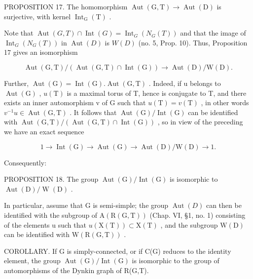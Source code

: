 PROPOSITION 17. The homomorphism \(\operatorname{Aut}(\mathrm{G},\mathrm{T})\to \operatorname{Aut}(\mathrm{D})\) is surjective, with kernel \(\operatorname{Int}_{\mathrm{G}}(\mathrm{T})\) .

Note that \(\operatorname{Aut}(G,T) \cap \operatorname{Int}(G) = \operatorname{Int}_{G}(N_{G}(T))\) and that the image of \(\operatorname{Int}_{G}(N_{G}(T))\) in \(\operatorname{Aut}(D)\) is \(W(D)\) (no. 5, Prop. 10). Thus, Proposition 17 gives an isomorphism

\[
\operatorname{Aut} (\mathrm{G}, \mathrm{T}) / (\operatorname{Aut} (\mathrm{G}, \mathrm{T}) \cap \operatorname{Int} (\mathrm{G})) \rightarrow \operatorname{Aut} (\mathrm{D}) / \mathrm{W} (\mathrm{D}).
\]

Further, \(\operatorname{Aut}(\mathrm{G}) = \operatorname{Int}(\mathrm{G}).\operatorname{Aut}(\mathrm{G}, \mathrm{T})\) . Indeed, if u belongs to \(\operatorname{Aut}(\mathrm{G})\) , \(u(\mathrm{T})\) is a maximal torus of T, hence is conjugate to T, and there exists an inner automorphism v of G such that \(u(\mathrm{T}) = v(\mathrm{T})\) , in other words \(v^{-1}u \in \operatorname{Aut}(\mathrm{G}, \mathrm{T})\) . It follows that \(\operatorname{Aut}(\mathrm{G})/\operatorname{Int}(\mathrm{G})\) can be identified with \(\operatorname{Aut}(\mathrm{G}, \mathrm{T})/(\operatorname{Aut}(\mathrm{G}, \mathrm{T}) \cap \operatorname{Int}(\mathrm{G}))\) , so in view of the preceding we have an exact sequence

\[
1 \to \operatorname{Int} (\mathrm{G}) \to \operatorname{Aut} (\mathrm{G}) \to \operatorname{Aut} (\mathrm{D}) / \mathrm{W} (\mathrm{D}) \to 1.\tag{16}
\]

Consequently:

PROPOSITION 18. The group \(\operatorname{Aut}(\mathrm{G}) / \operatorname{Int}(\mathrm{G})\) is isomorphic to \(\operatorname{Aut}(\mathrm{D}) / \operatorname{W}(\mathrm{D})\) .

In particular, assume that G is semi-simple; the group \(\operatorname{Aut}(D)\) can then be identified with the subgroup of \(\mathrm{A}(\mathrm{R}(\mathrm{G},\mathrm{T}))\) (Chap. VI, §1, no. 1) consisting of the elements u such that \(u(\mathrm{X}(\mathrm{T})) \subset \mathrm{X}(\mathrm{T})\) , and the subgroup \(\mathrm{W}(\mathrm{D})\) can be identified with \(\mathrm{W}(\mathrm{R}(\mathrm{G},\mathrm{T}))\) .

COROLLARY. If G is simply-connected, or if C(G) reduces to the identity element, the group \(\operatorname{Aut}(\mathrm{G})/\operatorname{Int}(\mathrm{G})\) is isomorphic to the group of automorphisms of the Dynkin graph of R(G,T).

